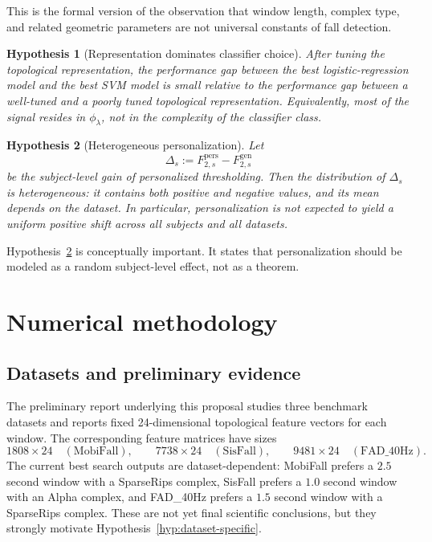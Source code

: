\documentclass[11pt]{article}
\newtheorem{hypothesis}{Hypothesis}[section]
\newcommand{\1}{\mathbf 1}
\begin{document}
This is the formal version of the observation that window length, complex type, and related geometric parameters are not universal constants of fall detection.

\begin{hypothesis}[Representation dominates classifier choice]\label{hyp:classifier-secondary}
After tuning the topological representation, the performance gap between the best logistic-regression model and the best SVM model is small relative to the performance gap between a well-tuned and a poorly tuned topological representation. Equivalently, most of the signal resides in $\phi_\lambda$, not in the complexity of the classifier class.
\end{hypothesis}

\begin{hypothesis}[Heterogeneous personalization]\label{hyp:personalization}
Let
\[
  \Delta_s:=F_{2,s}^{\mathrm{pers}}-F_{2,s}^{\mathrm{gen}}
\]
be the subject-level gain of personalized thresholding. Then the distribution of $\Delta_s$ is heterogeneous: it contains both positive and negative values, and its mean depends on the dataset. In particular, personalization is not expected to yield a uniform positive shift across all subjects and all datasets.
\end{hypothesis}

Hypothesis~\ref{hyp:personalization} is conceptually important. It states that personalization should be modeled as a random subject-level effect, not as a theorem.

\section{Numerical methodology}

\subsection{Datasets and preliminary evidence}

The preliminary report underlying this proposal studies three benchmark datasets and reports fixed 24-dimensional topological feature vectors for each window. The corresponding feature matrices have sizes
\[
  1808\times 24 \quad (\mathrm{MobiFall}),
  \qquad
  7738\times 24 \quad (\mathrm{SisFall}),
  \qquad
  9481\times 24 \quad (\mathrm{FAD\_40Hz}).
\]
The current best search outputs are dataset-dependent: MobiFall prefers a $2.5$ second window with a SparseRips complex, SisFall prefers a $1.0$ second window with an Alpha complex, and FAD\_40Hz prefers a $1.5$ second window with a SparseRips complex. These are not yet final scientific conclusions, but they strongly motivate Hypothesis~\ref{hyp:dataset-specific}.
\end{document}
